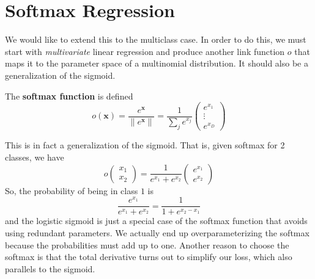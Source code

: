 \section{Softmax Regression}

  We would like to extend this to the multiclass case. In order to do this, we must start with \textit{multivariate} linear regression and produce another link function $o$ that maps it to the parameter space of a multinomial distribution. It should also be a generalization of the sigmoid. 

  \begin{definition}[Softmax]
    \label{def:softmax}
    The \textbf{softmax function} is defined 
    \begin{equation}
      o(\mathbf{x}) = \frac{e^{\mathbf{x}}}{\|e^{\mathbf{x}}\|} = \frac{1}{\sum_j e^{x_j}}\begin{pmatrix} e^{x_1} \\ \vdots \\ e^{x_D} \end{pmatrix}
    \end{equation}
  \end{definition}

  This is in fact a generalization of the sigmoid. That is, given softmax for 2 classes, we have 
  \begin{equation}
    o\begin{pmatrix} x_1 \\ x_2 \end{pmatrix} = \frac{1}{e^{x_1} + e^{x_2}} \begin{pmatrix} e^{x_1} \\ e^{x_2} \end{pmatrix}
  \end{equation}
  So, the probability of being in class $1$ is 
  \begin{equation}
    \frac{e^{x_1}}{e^{x_1} + e^{x_2}} = \frac{1}{1 + e^{x_2 - x_1}}
  \end{equation}
  and the logistic sigmoid is just a special case of the softmax function that avoids using redundant parameters. We actually end up overparameterizing the softmax because the probabilities must add up to one. Another reason to choose the softmax is that the total derivative turns out to simplify our loss, which also parallels to the sigmoid. 

